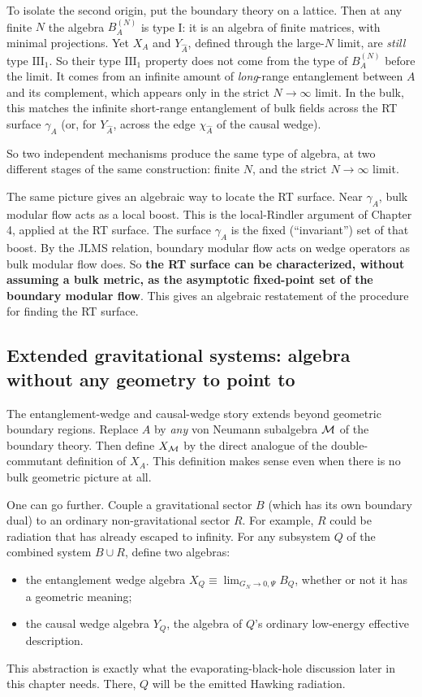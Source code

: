 To isolate the second origin, put the boundary theory on a lattice. Then at any finite $N$ the algebra
$B_A^{(N)}$ is type I: it is an algebra of finite matrices, with minimal projections. Yet $X_A$ and
$Y_{\widehat A}$, defined through the large-$N$ limit, are \emph{still} type $\mathrm{III}_1$. So their type
$\mathrm{III}_1$ property does not come from the type of $B_A^{(N)}$ before the limit. It comes from an
infinite amount of \emph{long}-range entanglement between $A$ and its complement, which appears only in the
strict $N\to\infty$ limit. In the bulk, this matches the infinite short-range entanglement of bulk fields
across the RT surface $\gamma_A$ (or, for $Y_{\widehat A}$, across the edge $\chi_{\widehat A}$ of the causal
wedge).

So two independent mechanisms produce the same type of algebra, at two different stages of the same
construction: finite $N$, and the strict $N\to\infty$ limit.

The same picture gives an algebraic way to locate the RT surface. Near $\gamma_A$, bulk modular flow acts as a
local boost. This is the local-Rindler argument of Chapter 4, applied at the RT surface. The surface
$\gamma_A$ is the fixed (``invariant'') set of that boost. By the JLMS relation, boundary modular flow acts on
wedge operators as bulk modular flow does. So \textbf{the RT surface can be characterized, without assuming a
bulk metric, as the asymptotic fixed-point set of the boundary modular flow}. This gives an algebraic
restatement of the procedure for finding the RT surface.

\subsection*{Extended gravitational systems: algebra without any geometry to point to}

The entanglement-wedge and causal-wedge story extends beyond geometric boundary regions. Replace $A$ by
\emph{any} von Neumann subalgebra $\mathcal{M}$ of the boundary theory. Then define $X_{\mathcal{M}}$ by the direct analogue of the
double-commutant definition of $X_A$. This definition makes sense even when there is no bulk geometric
picture at all.

One can go further. Couple a gravitational sector $B$ (which has its own boundary dual) to an ordinary
non-gravitational sector $R$. For example, $R$ could be radiation that has already escaped to infinity. For
any subsystem $Q$ of the combined system $B\cup R$, define two algebras:
\begin{itemize}
\item the entanglement wedge algebra $X_Q\equiv\lim_{G_N\to0,\Psi}B_Q$, whether or not it has a geometric
meaning;
\item the causal wedge algebra $Y_Q$, the algebra of $Q$'s ordinary low-energy effective description.
\end{itemize}
This abstraction is exactly what the evaporating-black-hole discussion later in this chapter needs. There,
$Q$ will be the emitted Hawking radiation.

